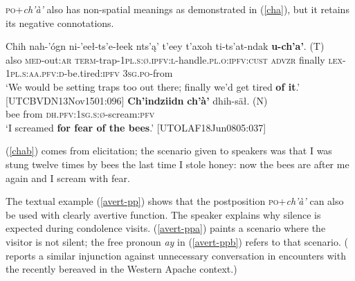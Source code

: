 \documentclass[output=paper,colorlinks,citecolor=brown
]{langscibook}
\begin{document}
\textsc{po}+\textit{ch'à'} also has non-spatial meanings as demonstrated in (\ref{cha}), but it retains its negative connotations. 

\begin{exe}
\ex 
\label{cha}
\begin{xlista}
\ex \label{chaa}
\gll Chih nah-'ógn ni-'eeł-ts'e-łeek {nts'ą' t'eey} t'axoh ti-ts'at-ndak {\textbf{u-ch'a'}. \textnormal{(T)}} \\
also \textsc{med}-out:\textsc{ar} \textsc{term}-trap-\textsc{1pl.s:ø.ipfv:l}-handle.\textsc{pl.o:ipfv:cust} \textsc{advzr} finally \textsc{lex-1pl.s:aa.pfv:d}-be.tired:\textsc{ipfv} \textsc{3sg.po}-from \\
\glt `We would be setting traps too out there; finally we'd get tired \textbf{of it}.' \\ \hfill [UTCBVDN13Nov1501:096]
\ex \label{chab}
\gll \textbf{Ch'indziidn} \textbf{ch'à'} {dhih-säł. \textnormal{(N)}} \\
bee from \textsc{dh.pfv:1sg.s:ø}-scream:\textsc{pfv} \\
\glt `I screamed \textbf{for fear of the bees}.' \hfill [UTOLAF18Jun0805:037]
\end{xlista}
\end{exe}

\noindent (\ref{chab}) comes from elicitation; the scenario given to speakers was that I was stung twelve times by bees the last time I stole honey: now the bees are after me again and I scream with fear.

The textual example (\ref{avert-pp}) shows that the postposition \textsc{po}+\textit{ch'à'} can also be used with clearly avertive function. The speaker explains why silence is expected during condolence visits. (\ref{avert-ppa}) paints a scenario where the visitor is not silent; the free pronoun \textit{ay} in (\ref{avert-ppb}) refers to that scenario. (\citet[90–92]{BassoK1990} reports a similar injunction against unnecessary conversation in encounters with the recently bereaved in the Western Apache context.)
\end{document}
